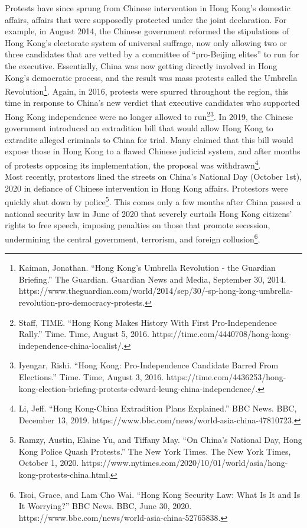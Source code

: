 \documentclass[10pt, letterpaper]{article}
\begin{document}
Protests have since sprung from Chinese intervention in Hong Kong's
domestic affairs, affairs that were supposedly protected under the joint
declaration. For example, in August 2014, the Chinese government
reformed the stipulations of Hong Kong's electorate system of universal
suffrage, now only allowing two or three candidates that are vetted by a
committee of ``pro-Beijing elites'' to run for the executive.
Essentially, China was now getting directly involved in Hong Kong's
democratic process, and the result was mass protests called the Umbrella
Revolution\footnote{Kaiman, Jonathan. ``Hong Kong's Umbrella Revolution
  - the Guardian Briefing.'' The Guardian. Guardian News and Media,
  September 30, 2014.
  https://www.theguardian.com/world/2014/sep/30/-sp-hong-kong-umbrella-revolution-pro-democracy-protests.}.
Again, in 2016, protests were spurred throughout the region, this time
in response to China's new verdict that executive candidates who
supported Hong Kong independence were no longer allowed to
run\footnote{Staff, TIME. ``Hong Kong Makes History With First
  Pro-Independence Rally.'' Time. Time, August 5, 2016.
  https://time.com/4440708/hong-kong-independence-china-localist/.}\footnote{Iyengar,
  Rishi. ``Hong Kong: Pro-Independence Candidate Barred From
  Elections.'' Time. Time, August 3, 2016.
  https://time.com/4436253/hong-kong-election-briefing-protests-edward-leung-china-independence/.}.
In 2019, the Chinese government introduced an extradition bill that
would allow Hong Kong to extradite alleged criminals to China for trial.
Many claimed that this bill would expose those in Hong Kong to a flawed
Chinese judicial system, and after months of protests opposing its
implementation, the proposal was withdrawn\footnote{Li, Jeff. ``Hong
  Kong-China Extradition Plans Explained.'' BBC News. BBC, December 13,
  2019. https://www.bbc.com/news/world-asia-china-47810723.}.\\


Most recently, protestors lined the streets on China's National Day
(October 1st), 2020 in defiance of Chinese intervention in Hong Kong
affairs. Protestors were quickly shut down by police\footnote{Ramzy,
  Austin, Elaine Yu, and Tiffany May. ``On China's National Day, Hong
  Kong Police Quash Protests.'' The New York Times. The New York Times,
  October 1, 2020.
  https://www.nytimes.com/2020/10/01/world/asia/hong-kong-protests-china.html.}.
This comes only a few months after China passed a national security law
in June of 2020 that severely curtails Hong Kong citizens' rights to
free speech, imposing penalties on those that promote secession,
undermining the central government, terrorism, and foreign
collusion\footnote{Tsoi, Grace, and Lam Cho Wai. ``Hong Kong Security
  Law: What Is It and Is It Worrying?'' BBC News. BBC, June 30, 2020.
  https://www.bbc.com/news/world-asia-china-52765838.}.
\end{document}
